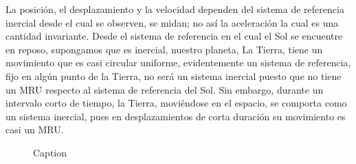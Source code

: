 La posición, el desplazamiento y la velocidad dependen del sistema de referencia inercial desde el cual se observen, se midan; no así la aceleración la cual es una cantidad invariante. Desde el sistema de referencia en el cual el Sol se encuentre en reposo, supongamos que es inercial, nuestro planeta, La Tierra, tiene un movimiento que es casi circular uniforme, evidentemente un sistema de referencia, fijo en algún punto de la Tierra, no será un sistema inercial puesto que no tiene un MRU respecto al sistema de referencia del Sol. Sin embargo, durante un intervalo corto de tiempo, la Tierra, moviéndose en el espacio, se comporta como un sistema inercial, pues en desplazamientos de corta duración su movimiento es casi un MRU.
\begin{figure}
    \centering
    
    \caption{Caption}
    \label{fig:enter-label}
\end{figure}

